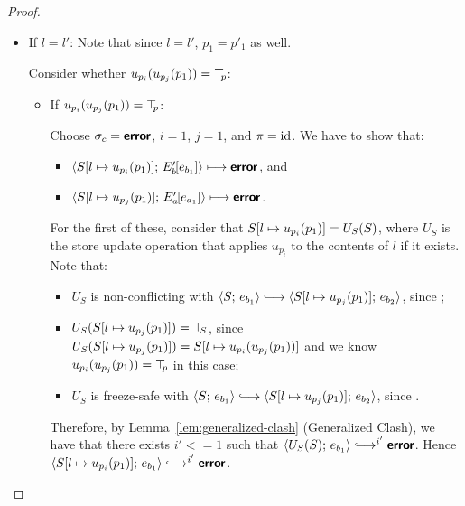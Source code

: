 \begin{proof}
\begin{enumerate}
\begin{enumerate}
\begin{itemize}
        \item If $l = l'$:
          Note that since $l = l'$, $p_1 = p'_1$ as well.

          Consider whether $u_{p_i}(u_{p_j}(p_1)) = \top\hspace{-0.85mm}_{p}$:
          \begin{itemize}
          \item If $u_{p_i}(u_{p_j}(p_1)) = \top\hspace{-0.85mm}_{p}$:

            Choose $\sigma_c = \textbf{\textsf{error}}$, $i = 1$, $j = 1$, and $\pi =
            \mathrm{id}$.  We have to show that:

            \begin{itemize}
            \item
              $\langle S[l \mapsto u_{p_i}(p_1)];\, E'_b\hspace{-1mm}\left[e_{b_1}\right] \rangle
              \longmapsto \textbf{\textsf{error}}$, and
            \item
              $\langle S[l \mapsto u_{p_j}(p_1)];\, E'_a\hspace{-1mm}\left[e_{a_1}\right] \rangle
              \longmapsto \textbf{\textsf{error}}$.
            \end{itemize}

            For the first of these, consider that
            $S[l \mapsto u_{p_i}(p_1)] = U_S(S)$, where $U_S$ is the
            store update operation that applies $u_{p_i}$ to the
            contents of $l$ if it exists.  Note that:
            \begin{itemize}
            \item $U_S$ is non-conflicting with $\config{S}{e_{b_1}}
              \parstepsto
              \config{\extSRaw{S}{l}{u_{p_j}(p_1)}}{e_{b_2}}$, since
              ;
            \item $U_S(S[l \mapsto u_{p_j}(p_1)]) = \top\hspace{-0.85mm}_{S}$, since
              $U_S(S[l \mapsto u_{p_j}(p_1)]) =
              S[l \mapsto u_{p_i}(u_{p_j}(p_1))]$ and we know
              $u_{p_i}(u_{p_j}(p_1)) = \top\hspace{-0.85mm}_{p}$ in this case;
            \item $U_S$ is freeze-safe with $\config{S}{e_{b_1}}
              \parstepsto
              \config{\extSRaw{S}{l}{u_{p_j}(p_1)}}{e_{b_2}}$, since
              .
            \end{itemize}

            Therefore, by Lemma~\ref{lem:generalized-clash}
            (Generalized Clash), we have that there exists $i' <= 1$
            such that $\config{U_S(S)}{e_{b_1}} \parstepsto^{i'}
            \error$.  Hence
            $\config{\extSRaw{S}{l}{u_{p_i}(p_1)}}{e_{b_1}}
            \parstepsto^{i'} \error$.


\end{itemize}
\end{itemize}
\end{enumerate}
\end{enumerate}
\end{proof}

